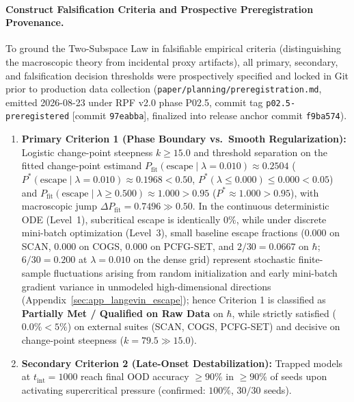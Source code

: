\documentclass{article}
\theoremstyle{plain}
\theoremstyle{definition}
\begin{document}
\paragraph{Construct Falsification Criteria and Prospective Preregistration Provenance.}
\label{sec:falsification_criteria}
To ground the Two-Subspace Law in falsifiable empirical criteria (distinguishing the macroscopic theory from incidental proxy artifacts), all primary, secondary, and falsification decision thresholds were prospectively specified and locked in Git prior to production data collection (\texttt{paper/planning/preregistration.md}, emitted 2026-08-23 under RPF v2.0 phase P02.5, commit tag \texttt{p02.5-preregistered} [commit \texttt{97eabba}], finalized into release anchor commit \texttt{f9ba574}).
\begin{enumerate}[leftmargin=*,noitemsep]
    \item \textbf{Primary Criterion 1 (Phase Boundary vs.\ Smooth Regularization):} Logistic change-point steepness $k \ge 15.0$ and threshold separation on the fitted change-point estimand $P_{\text{fit}}(\text{escape} \mid \lambda = 0.010) \approx 0.2504$ ($P^*(\text{escape} \mid \lambda = 0.010) \approx 0.1968 < 0.50$, $P^*(\lambda \le 0.000) \le 0.000 < 0.05$) and $P_{\text{fit}}(\text{escape} \mid \lambda \ge 0.500) \approx 1.000 > 0.95$ ($P^* \approx 1.000 > 0.95$), with macroscopic jump $\Delta P_{\text{fit}} = 0.7496 \gg 0.50$. In the continuous deterministic ODE (Level~1), subcritical escape is identically $0\%$, while under discrete mini-batch optimization (Level~3), small baseline escape fractions ($0.000$ on SCAN, $0.000$ on COGS, $0.000$ on PCFG-SET, and $2/30 = 0.0667$ on $\hbar$; $6/30 = 0.200$ at $\lambda = 0.010$ on the dense grid) represent stochastic finite-sample fluctuations arising from random initialization and early mini-batch gradient variance in unmodeled high-dimensional directions (Appendix~\ref{sec:app_langevin_escape}); hence Criterion 1 is classified as \textbf{Partially Met / Qualified on Raw Data} on $\hbar$, while strictly satisfied ($0.0\% < 5\%$) on external suites (SCAN, COGS, PCFG-SET) and decisive on change-point steepness ($k = 79.5 \gg 15.0$).
    \item \textbf{Secondary Criterion 2 (Late-Onset Destabilization):} Trapped models at $t_{\text{int}} = 1000$ reach final OOD accuracy $\ge 90\%$ in $\ge 90\%$ of seeds upon activating supercritical pressure (confirmed: $100\%$, $30/30$ seeds).

\end{enumerate}
\end{document}
